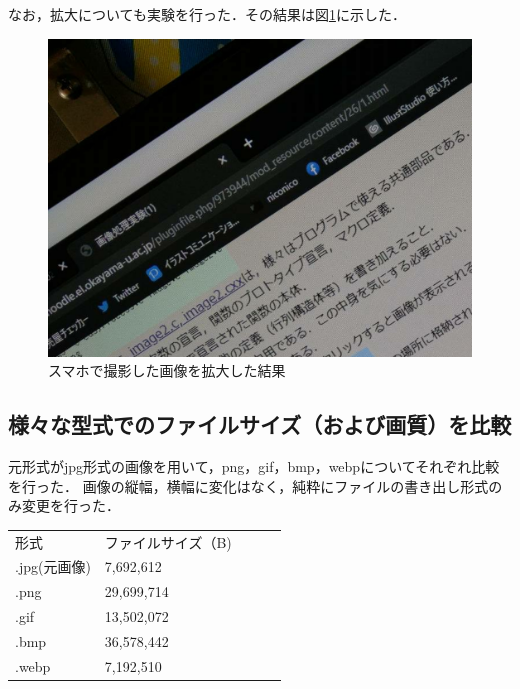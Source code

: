 \documentclass[11pt]{jarticle}
\begin{document}
なお，拡大についても実験を行った．その結果は図\ref{sumaho_kakudai.jpg}に示した．
\begin{figure}[htbp]
    \centering
    \includegraphics[scale=.1]{sumaho_kakudai.jpg}
    \caption{スマホで撮影した画像を拡大した結果}
    \label{sumaho_kakudai.jpg}
\end{figure}

\subsection{様々な型式でのファイルサイズ（および画質）を比較}

元形式がjpg形式の画像を用いて，png，gif，bmp，webpについてそれぞれ比較を行った．
画像の縦幅，横幅に変化はなく，純粋にファイルの書き出し形式のみ変更を行った．
\begin{table}[h]
    \begin{center}
    \begin{tabular}{l|llll}
    \cline{1-2}
    形式        & ファイルサイズ（B) &  &  &  \\ \cline{1-2}
    .jpg(元画像) & 7,692,612  &  &  &  \\
    .png      & 29,699,714 &  &  &  \\
    .gif      & 13,502,072 &  &  &  \\
    .bmp      & 36,578,442 &  &  &  \\
    .webp     & 7,192,510  &  &  &  \\ \cline{1-2}
    \end{tabular}
\end{center}
\end{table}
\end{document}
